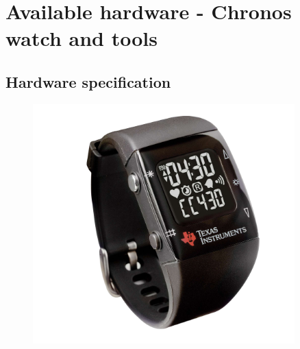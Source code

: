 \chapter{Available hardware - Chronos watch and tools}


\section{Hardware specification}

\begin{figure}[h!]
  \centering
  \includegraphics[width=0.9\textwidth]{img/chronos_watch.jpg}
  \caption{}
\end{figure}

